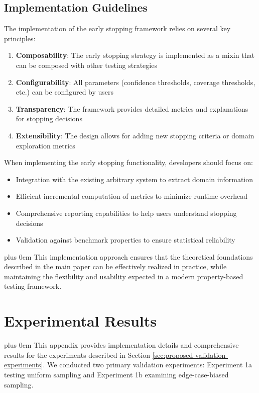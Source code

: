 \documentclass[conference]{IEEEtran}
\newcommand{\justifytext}{\leftskip=0pt \rightskip=0pt plus 0cm}
\begin{document}
\subsection{Implementation Guidelines}

The implementation of the early stopping framework relies on several key principles:

\begin{enumerate}
\item \textbf{Composability}: The early stopping strategy is implemented as a mixin that can be composed with other testing strategies
\item \textbf{Configurability}: All parameters (confidence thresholds, coverage thresholds, etc.) can be configured by users
\item \textbf{Transparency}: The framework provides detailed metrics and explanations for stopping decisions
\item \textbf{Extensibility}: The design allows for adding new stopping criteria or domain exploration metrics
\end{enumerate}

When implementing the early stopping functionality, developers should focus on:

\begin{itemize}
\item Integration with the existing arbitrary system to extract domain information
\item Efficient incremental computation of metrics to minimize runtime overhead
\item Comprehensive reporting capabilities to help users understand stopping decisions
\item Validation against benchmark properties to ensure statistical reliability
\end{itemize}

\justifytext
This implementation approach ensures that the theoretical foundations described in the main paper can be effectively realized in practice, while maintaining the flexibility and usability expected in a modern property-based testing framework.

\section{Experimental Results}
\label{sec:experimental-results}

\justifytext
This appendix provides implementation details and comprehensive results for the experiments described in Section \ref{sec:proposed-validation-experiments}. We conducted two primary validation experiments: Experiment 1a testing uniform sampling and Experiment 1b examining edge-case-biased sampling.
\end{document}
